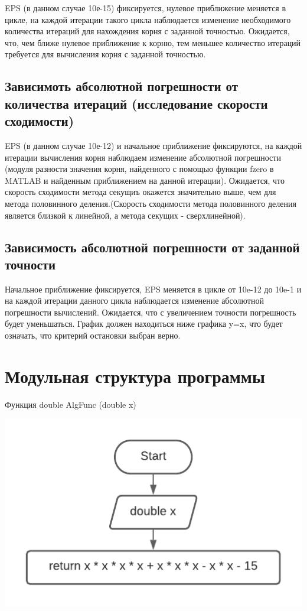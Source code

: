 EPS (в данном случае 10е-15) фиксируется, нулевое приближение меняется в цикле, на каждой итерации такого цикла наблюдается изменение необходимого количества итераций для нахождения корня с заданной точностью. Ожидается, что, чем ближе нулевое приближение к корню, тем меньшее количество итераций требуется для вычисления корня с заданной точностью.

\subsection{Зависимоть абсолютной погрешности от количества итераций (исследование скорости сходимости)}

EPS (в данном случае 10е-12) и начальное приближение фиксируются, на каждой итерации вычисления корня наблюдаем изменение абсолютной погрешности (модуля разности значения корня, найденного с помощью функции fzero в MATLAB и найденным приближением на данной итерации). Ожидается, что скорость сходимости метода секущиъ окажется значительно выше, чем для метода половинного деления.(Скорость сходимости метода половинного деления является близкой к линейной, а метода секущих - сверхлинейной).

\subsection{Зависимость абсолютной погрешности от заданной точности}

Начальное приближение фиксируется, EPS меняется в цикле от 10e-12 до 10e-1 и на каждой итерации данного цикла наблюдается изменение абсолютной погрешности вычислений. Ожидается, что с увеличением точности погрешность будет уменьшаться. График должен находиться ниже графика y=x, что будет означать, что критерий остановки выбран верно.

\section{Модульная структура программы}


Функция double AlgFunc (double x)

\includegraphics[scale=0.5]{block1.pdf}


